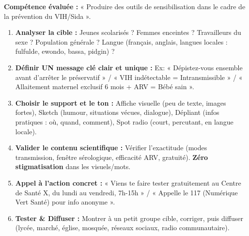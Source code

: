 \documentclass[11pt]{article}
\begin{document}
\begin{methode}
\textbf{Compétence évaluée :} « Produire des outils de sensibilisation dans le cadre de la prévention du VIH/Sida ».
\begin{enumerate}
    \item \textbf{Analyser la cible :} Jeunes scolarisés ? Femmes enceintes ? Travailleurs du sexe ? Population générale ? Langue (français, anglais, langues locales : fulfulde, ewondo, bassa, pidgin) ?
    \item \textbf{Définir UN message clé clair et unique :} Ex: « Dépistez-vous ensemble avant d'arrêter le préservatif » / « VIH indétectable = Intransmissible » / « Allaitement maternel exclusif 6 mois + ARV = Bébé sain ».
    \item \textbf{Choisir le support et le ton :} Affiche visuelle (peu de texte, images fortes), Sketch (humour, situations vécues, dialogue), Dépliant (infos pratiques : où, quand, comment), Spot radio (court, percutant, en langue locale).
    \item \textbf{Valider le contenu scientifique :} Vérifier l'exactitude (modes transmission, fenêtre sérologique, efficacité ARV, gratuité). \textbf{Zéro stigmatisation} dans les visuels/mots.
    \item \textbf{Appel à l'action concret :} « Viens te faire tester gratuitement au Centre de Santé X, du lundi au vendredi, 7h-15h » / « Appelle le 117 (Numérique Vert Santé) pour info anonyme ».
    \item \textbf{Tester \& Diffuser :} Montrer à un petit groupe cible, corriger, puis diffuser (lycée, marché, église, mosquée, réseaux sociaux, radio communautaire).
\end{enumerate}
\end{methode}
\end{document}
